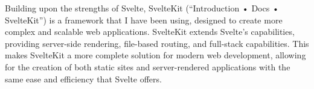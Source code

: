 Building upon the strengths of Svelte, SvelteKit (“Introduction • Docs • SvelteKit”) is a framework that I have been using, designed to create more complex and scalable web applications. SvelteKit extends Svelte's capabilities, providing server-side rendering, file-based routing, and full-stack capabilities. This makes SvelteKit a more complete solution for modern web development, allowing for the creation of both static sites and server-rendered applications with the same ease and efficiency that Svelte offers.
